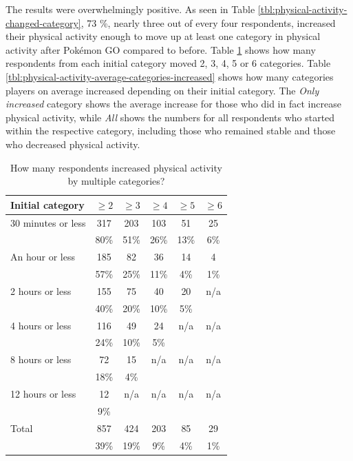 The results were overwhelmingly positive. As seen in Table \ref{tbl:physical-activity-changed-category}, 73 \%, nearly three out of every four respondents, increased their physical activity enough to move up at least one category in physical activity after Pokémon GO compared to before. Table \ref{tbl:physical-activity-increased-multiple-categories} shows how many respondents from each initial category moved 2, 3, 4, 5 or 6 categories. Table \ref{tbl:physical-activity-average-categories-increased} shows how many categories players on average increased depending on their initial category. The \emph{Only increased} category shows the average increase for those who did in fact increase physical activity, while \emph{All} shows the numbers for all respondents who started within the respective category, including those who remained stable and those who decreased physical activity.

\begin{table}[h]
	\centering
	\caption{How many respondents increased physical activity by multiple categories?}
	\label{tbl:physical-activity-increased-multiple-categories}
	\begin{tabular}{|l|c|c|c|c|c|}
		\hline
		\textbf{Initial category} & \textbf{\( \geq2 \)} & \textbf{\( \geq3 \)} & \textbf{\( \geq4 \)}	& \textbf{\( \geq5 \)} & \textbf{\( \geq6 \)}\\
		\hline\hline
		30 minutes or less	& 317	& 203	& 103	& 51	& 25\\
							& 80\%	& 51\%	& 26\%	& 13\%	& 6\%\\\hline
		An hour or less		& 185	& 82	& 36	& 14	& 4\\
							& 57\%	& 25\%	& 11\%	& 4\%	& 1\%\\\hline
		2 hours or less		& 155	& 75	& 40	& 20	& n/a\\
							& 40\%	& 20\%	& 10\%	& 5\%	&\\\hline
		4 hours or less		& 116	& 49	& 24	& n/a	& n/a\\
							& 24\%	& 10\%	& 5\%	&		&\\\hline
		8 hours or less		& 72	& 15	& n/a	& n/a	& n/a\\
							& 18\%	& 4\%	& 		&		&\\\hline
		12 hours or less	& 12	& n/a	& n/a	& n/a	& n/a\\
							& 9\%	& 		&		&		&\\\hline
		\hline
		Total				& 857	& 424	& 203	& 85	& 29\\
							& 39\%	& 19\%	& 9\%	& 4\%	& 1\%\\\hline
	\end{tabular}
\end{table}

